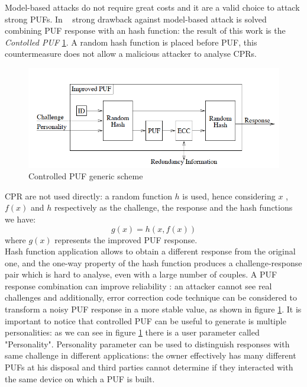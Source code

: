 \documentclass[../tesi.tex]{subfiles}
\begin{document}
Model-based attacks do not require great costs and it are a valid choice to attack strong PUFs.
In ~\cite{gassend2002controlled} strong  drawback against model-based attack is solved combining PUF response with an hash function: the result of this work is the \emph{Contolled PUF} \ref{fig:controlledpuf}. A random hash function is placed before PUF, this countermeasure does not allow a malicious attacker to analyse CPRs. 
\begin{figure}
\centering
\includegraphics[scale=0.40]{images/controlledpuf.png}
\caption{Controlled PUF generic scheme}
\label{fig:controlledpuf}
\end{figure}
CPR are not used directly: a random function $h$ is used, hence considering $x$ ,$f(x)$ and $h$ respectively as the challenge, the response and the hash functions we have:
\begin{equation}
g(x) = h(x,f(x))
\end{equation}
where $g(x)$ represents the improved PUF response. \\
Hash function application allows to obtain a different response from the original one, and the one-way property of the hash function produces a challenge-response pair which is hard to analyse, even with a large number of couples. A PUF response combination can improve reliability : an attacker cannot see real challenges and additionally, error correction code technique can be considered to transform a noisy PUF response in a more stable value, as shown in figure \ref{fig:controlledpuf}. 
It is important to notice that controlled PUF can be useful to generate is multiple personalities: as we can see in figure \ref{fig:controlledpuf} there is a user parameter called "Personality". Personality parameter can be used to distinguish \puf{} responses with same challenge in different applications: the owner effectively has many different PUFs at his disposal and third parties cannot determine if they interacted with the same device on which a PUF is built. 
\end{document}

